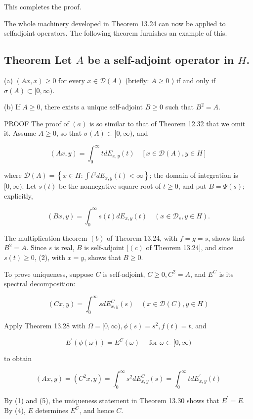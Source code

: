 \documentclass[10pt]{article}
\begin{document}
This completes the proof.

The whole machinery developed in Theorem 13.24 can now be applied to selfadjoint operators. The following theorem furnishes an example of this.

\subsection{Theorem Let $A$ be a self-adjoint operator in $H$.}
(a) $(A x, x) \geq 0$ for every $x \in \mathscr{D}(A)$ (briefly: $A \geq 0$ ) if and only if $\sigma(A) \subset[0, \infty)$.

(b) If $A \geq 0$, there exists a unique self-adjoint $B \geq 0$ such that $B^{2}=A$.

PROOF The proof of $(a)$ is so similar to that of Theorem 12.32 that we omit it. Assume $A \geq 0$, so that $\sigma(A) \subset[0, \infty)$, and

$$
(A x, y)=\int_{0}^{\infty} t d E_{x, y}(t) \quad[x \in \mathscr{D}(A), y \in H]
$$

where $\mathscr{D}(A)=\left\{x \in H: \int t^{2} d E_{x, y}(t)<\infty\right\}$; the domain of integration is $[0, \infty)$. Let $s(t)$ be the nonnegative square root of $t \geq 0$, and put $B=\Psi(s)$; explicitly,

$$
(B x, y)=\int_{0}^{\infty} s(t) d E_{x, y}(t) \quad\left(x \in \mathscr{D}_{s}, y \in H\right) .
$$

The multiplication theorem $(b)$ of Theorem 13.24, with $f=g=s$, shows that $B^{2}=A$. Since $s$ is real, $B$ is self-adjoint $[(c)$ of Theorem 13.24], and since $s(t) \geq 0$, (2), with $x=y$, shows that $B \geq 0$.

To prove uniqueness, suppose $C$ is self-adjoint, $C \geq 0, C^{2}=A$, and $E^{C}$ is its spectral decomposition:

$$
(C x, y)=\int_{0}^{\infty} s d E_{x, y}^{C}(s) \quad(x \in \mathscr{D}(C), y \in H)
$$

Apply Theorem 13.28 with $\Omega=[0, \infty), \phi(s)=s^{2}, f(t)=t$, and

$$
E^{\prime}(\phi(\omega))=E^{C}(\omega) \quad \text { for } \omega \subset[0, \infty)
$$

to obtain

$$
(A x, y)=\left(C^{2} x, y\right)=\int_{0}^{\infty} s^{2} d E_{x, y}^{C}(s)=\int_{0}^{\infty} t d E_{x, y}^{\prime}(t)
$$

By (1) and (5), the uniqueness statement in Theorem 13.30 shows that $E^{\prime}=E$. By (4), $E$ determines $E^{C}$, and hence $C$.
\end{document}
